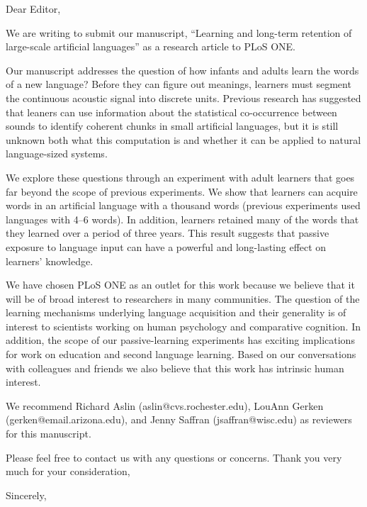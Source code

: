\documentclass[12pt]{letter}
\begin{document}
\begin{letter}

Dear Editor,

We are writing to submit our manuscript, ``Learning and long-term retention of large-scale artificial languages'' as a research article to PLoS ONE. 

Our manuscript addresses the question of how infants and adults learn the words of a new language? Before they can figure out meanings, learners must segment the continuous acoustic signal into discrete units. Previous research has suggested that leaners can use information about the statistical co-occurrence between sounds to identify coherent chunks in small artificial languages, but it is still unknown both what this computation is and whether it can be applied to natural language-sized systems. 

We explore these questions through an experiment with adult learners that goes far beyond the scope of previous experiments. We show that learners can acquire words in an artificial language with a thousand words (previous experiments used languages with 4--6 words). In addition, learners retained many of the words that they learned over a period of three years. This result suggests that passive exposure to language input can have a powerful and long-lasting effect on learners' knowledge. 

We have chosen PLoS ONE as an outlet for this work because we believe that it will be of broad interest to researchers in many communities. The question of the learning mechanisms underlying language acquisition and their generality is of interest to scientists working on human psychology and comparative cognition. In addition, the scope of our passive-learning experiments has exciting implications for work on education and second language learning. Based on our conversations with colleagues and friends we also believe that this work has intrinsic human interest.

We recommend Richard Aslin (aslin{@}cvs.rochester.edu), LouAnn Gerken (gerken{@}email.arizona.edu), and Jenny Saffran (jsaffran{@}wisc.edu) as reviewers for this manuscript.

Please feel free to contact us with any questions or concerns. Thank you very much for your consideration,


\closing{Sincerely,}

\end{letter}
\end{document}
